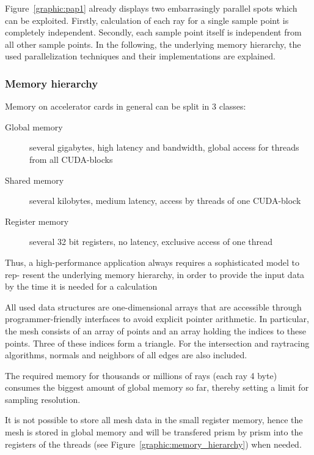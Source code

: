 Figure~\ref{graphic:pap1} already displays two embarrasingly parallel
spots which can be exploited. Firstly, calculation of each ray for a
single sample point is completely independent. Secondly, each sample
point itself is independent from all other sample points.  In the
following, the underlying memory hierarchy, the used parallelization
techniques and their implementations are explained.

\subsubsection{Memory hierarchy}
Memory on accelerator cards in general can be split in 3 classes:
\begin{description}
  \item[Global memory] several gigabytes, high latency and bandwidth,
    global access for threads from all CUDA-blocks
  \item[Shared memory] several kilobytes, medium latency, access by
    threads of one CUDA-block
  \item[Register memory] several 32 bit registers, no latency,
    exclusive access of one thread
\end{description}
Thus, a high-performance application always requires a sophisticated
model to rep- resent the underlying memory hierarchy, in order to
provide the input data by the time it is needed for a calculation

All used data structures are one-dimensional arrays that are
accessible through programmer-friendly interfaces to avoid explicit
pointer arithmetic.  In particular, the mesh consists of an array of
points and an array holding the indices to these points. Three of
these indices form a triangle.  For the intersection and raytracing
algorithms, normals and neighbors of all edges are also included.

The required memory for thousands or millions of rays (each ray 4
byte) consumes the biggest amount of global memory so far, thereby
setting a limit for sampling resolution.

It is not possible to store all mesh data in the small register
memory, hence the mesh is stored in global memory and will be
transfered prism by prism into the registers of the threads (see
Figure~\ref{graphic:memory_hierarchy}) when needed.

